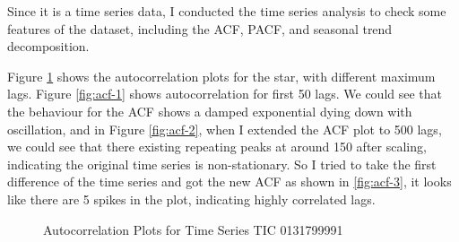 \documentclass[
]{article}
\begin{document}
Since it is a time series data, I conducted the time series analysis to check some features of the dataset, including the ACF, PACF, and seasonal trend decomposition.

Figure \ref{fig:acf} shows the autocorrelation plots for the star, with different maximum lags. Figure \ref{fig:acf-1} shows autocorrelation for first 50 lags. We could see that the behaviour for the ACF shows a damped exponential dying down with oscillation, and in Figure \ref{fig:acf-2}, when I extended the ACF plot to 500 lags, we could see that there existing repeating peaks at around 150 after scaling, indicating the original time series is non-stationary. So I tried to take the first difference of the time series and got the new ACF as shown in \ref{fig:acf-3}, it looks like there are 5 spikes in the plot, indicating highly correlated lags.

\begin{figure}[H]

{\centering {}

}

\caption{Autocorrelation Plots for Time Series TIC 0131799991}\label{fig:acf}
\end{figure}
\end{document}
